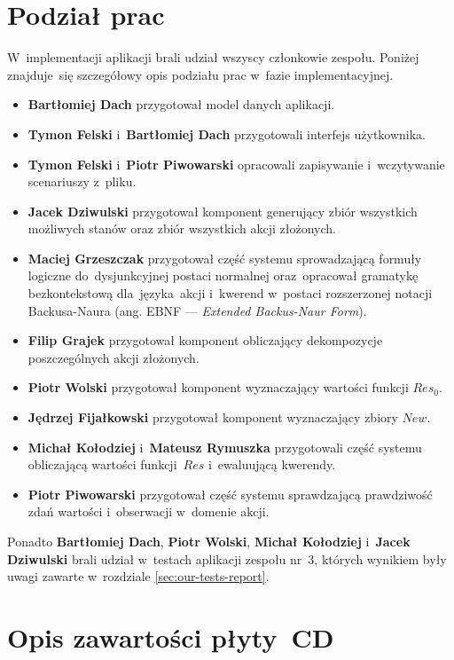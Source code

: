 \documentclass[11pt,a4paper]{article}
\begin{document}
\section{Podział prac}

W~implementacji aplikacji brali udział wszyscy członkowie zespołu.
Poniżej znajduje~się szczegółowy opis podziału prac w~fazie implementacyjnej.

\begin{itemize}
    \item \textbf{Bartłomiej Dach} przygotował model danych aplikacji.
    \item \textbf{Tymon Felski} i~\textbf{Bartłomiej Dach} przygotowali interfejs użytkownika.
    \item \textbf{Tymon Felski} i~\textbf{Piotr Piwowarski} opracowali zapisywanie i~wczytywanie scenariuszy z~pliku.
    \item \textbf{Jacek Dziwulski} przygotował komponent generujący zbiór wszystkich możliwych stanów oraz zbiór wszystkich akcji złożonych.
    \item \textbf{Maciej Grzeszczak} przygotował część systemu sprowadzającą formuły logiczne do~dysjunkcyjnej postaci normalnej oraz~opracował gramatykę bezkontekstową dla~języka~akcji i~kwerend w~postaci rozszerzonej notacji Backusa-Naura (ang. EBNF --- \emph{Extended Backus-Naur Form}).
    \item \textbf{Filip Grajek} przygotował komponent obliczający dekompozycje poszczególnych akcji złożonych.
    \item \textbf{Piotr Wolski} przygotował komponent wyznaczający wartości funkcji ${Res}_0$.
    \item \textbf{Jędrzej Fijałkowski} przygotował komponent wyznaczający zbiory $New$.
    \item \textbf{Michał Kołodziej} i~\textbf{Mateusz Rymuszka} przygotowali część systemu obliczającą wartości funkcji~$Res$ i~ewaluującą kwerendy.
    \item \textbf{Piotr Piwowarski} przygotował część systemu sprawdzającą prawdziwość zdań wartości i~obserwacji w~domenie akcji.
\end{itemize}

Ponadto \textbf{Bartłomiej Dach}, \textbf{Piotr Wolski}, \textbf{Michał Kołodziej} i~\textbf{Jacek Dziwulski} brali udział w~testach aplikacji zespołu nr~3, których wynikiem były uwagi zawarte w~rozdziale \ref{sec:our-tests-report}.

\section{Opis zawartości płyty~CD}
\end{document}
